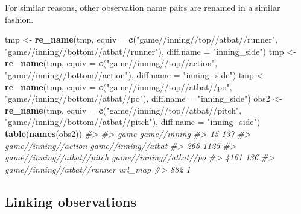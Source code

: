 \documentclass[12pt,]{isuthesis}
\newenvironment{Shaded}{\begin{snugshade}}{\end{snugshade}}
\newcommand{\KeywordTok}[1]{\textcolor[rgb]{0.13,0.29,0.53}{\textbf{{#1}}}}
\newcommand{\DataTypeTok}[1]{\textcolor[rgb]{0.13,0.29,0.53}{{#1}}}
\newcommand{\StringTok}[1]{\textcolor[rgb]{0.31,0.60,0.02}{{#1}}}
\newcommand{\CommentTok}[1]{\textcolor[rgb]{0.56,0.35,0.01}{\textit{{#1}}}}
\newcommand{\NormalTok}[1]{{#1}}
\begin{document}
For similar reasons, other observation name pairs are renamed in a
similar fashion.

\begin{Shaded}
\begin{Highlighting}[]
\NormalTok{tmp <-}\StringTok{ }\KeywordTok{re_name}\NormalTok{(tmp, }\DataTypeTok{equiv =} \KeywordTok{c}\NormalTok{(}\StringTok{"game//inning//top//atbat//runner"}\NormalTok{,                             }
  \StringTok{"game//inning//bottom//atbat//runner"}\NormalTok{), }\DataTypeTok{diff.name =} \StringTok{"inning_side"}\NormalTok{)}
\NormalTok{tmp <-}\StringTok{ }\KeywordTok{re_name}\NormalTok{(tmp, }\DataTypeTok{equiv =} \KeywordTok{c}\NormalTok{(}\StringTok{"game//inning//top//action"}\NormalTok{,                             }
  \StringTok{"game//inning//bottom//action"}\NormalTok{), }\DataTypeTok{diff.name =} \StringTok{"inning_side"}\NormalTok{)  }
\NormalTok{tmp <-}\StringTok{ }\KeywordTok{re_name}\NormalTok{(tmp, }\DataTypeTok{equiv =} \KeywordTok{c}\NormalTok{(}\StringTok{"game//inning//top//atbat//po"}\NormalTok{,                            }
  \StringTok{"game//inning//bottom//atbat//po"}\NormalTok{), }\DataTypeTok{diff.name =} \StringTok{"inning_side"}\NormalTok{)}
\NormalTok{obs2 <-}\StringTok{ }\KeywordTok{re_name}\NormalTok{(tmp, }\DataTypeTok{equiv =} \KeywordTok{c}\NormalTok{(}\StringTok{"game//inning//top//atbat//pitch"}\NormalTok{,                             }
  \StringTok{"game//inning//bottom//atbat//pitch"}\NormalTok{), }\DataTypeTok{diff.name =} \StringTok{"inning_side"}\NormalTok{) }
\KeywordTok{table}\NormalTok{(}\KeywordTok{names}\NormalTok{(obs2))}
\CommentTok{#> }
\CommentTok{#>                        game                game//inning }
\CommentTok{#>                          15                         137 }
\CommentTok{#>        game//inning//action         game//inning//atbat }
\CommentTok{#>                         266                        1125 }
\CommentTok{#>  game//inning//atbat//pitch     game//inning//atbat//po }
\CommentTok{#>                        4161                         136 }
\CommentTok{#> game//inning//atbat//runner                     url_map }
\CommentTok{#>                         882                           1}
\end{Highlighting}
\end{Shaded}

\subsection{Linking observations}\label{linking-observations}
\end{document}
